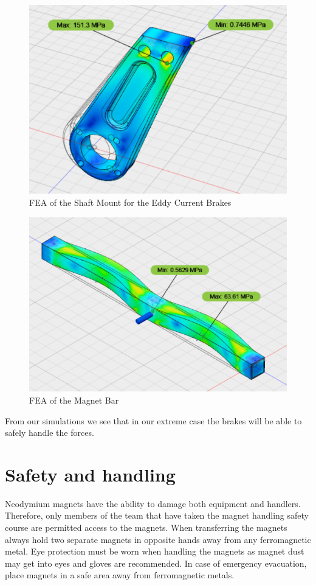 \documentclass[main.tex]{subfiles}
\begin{document}
    \begin{figure}
    	\centering
        \includegraphics[width = \linewidth]{images/ShaftMount}
        \caption{FEA of the Shaft Mount for the Eddy Current Brakes}
        \label{fig:ShafttMount}
    \end{figure}
    \begin{figure}
    	\centering
        \includegraphics[width=\linewidth]{images/MagnetBarFEA}
        \caption{FEA of the Magnet Bar}
        \label{fig:MagnetBar}
    \end{figure}
    From our simulations we see that in our extreme case the brakes will be able to safely handle the forces.\\

    \section{Safety and handling}
    Neodymium magnets have the ability to damage both equipment and handlers. Therefore, only members of the team that have taken the magnet handling safety course are permitted access to the magnets. When transferring the magnets always hold two separate magnets in opposite hands away from any ferromagnetic metal. Eye protection must be worn when handling the magnets as magnet dust may get into eyes and gloves are recommended. In case of emergency evacuation, place magnets in a safe area away from ferromagnetic metals. 
    
\end{document}
